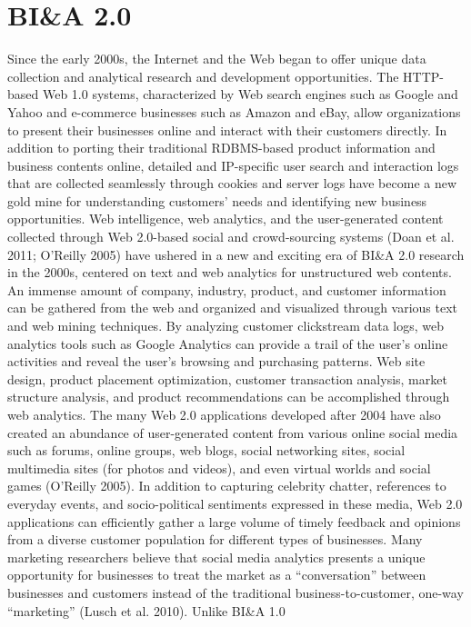 \section*{BI\&A 2.0}
Since the early 2000s, the Internet and the Web began to offer
unique data collection and analytical research and development opportunities. The HTTP-based Web 1.0 systems,
characterized by Web search engines such as Google and
Yahoo and e-commerce businesses such as Amazon and
eBay, allow organizations to present their businesses online
and interact with their customers directly. In addition to
porting their traditional RDBMS-based product information
and business contents online, detailed and IP-specific user
search and interaction logs that are collected seamlessly
through cookies and server logs have become a new gold
mine for understanding customers’ needs and identifying new
business opportunities. Web intelligence, web analytics, and
the user-generated content collected through Web 2.0-based
social and crowd-sourcing systems (Doan et al. 2011;
O’Reilly 2005) have ushered in a new and exciting era of
BI\&A 2.0 research in the 2000s, centered on text and web
analytics for unstructured web contents.
An immense amount of company, industry, product, and
customer information can be gathered from the web and
organized and visualized through various text and web mining
techniques. By analyzing customer clickstream data logs,
web analytics tools such as Google Analytics can provide a
trail of the user’s online activities and reveal the user’s
browsing and purchasing patterns. Web site design, product
placement optimization, customer transaction analysis, market
structure analysis, and product recommendations can be
accomplished through web analytics. The many Web 2.0
applications developed after 2004 have also created an abundance of user-generated content from various online social
media such as forums, online groups, web blogs, social networking sites, social multimedia sites (for photos and videos),
and even virtual worlds and social games (O’Reilly 2005). In
addition to capturing celebrity chatter, references to everyday
events, and socio-political sentiments expressed in these
media, Web 2.0 applications can efficiently gather a large
volume of timely feedback and opinions from a diverse
customer population for different types of businesses.
Many marketing researchers believe that social media
analytics presents a unique opportunity for businesses to treat
the market as a “conversation” between businesses and
customers instead of the traditional business-to-customer,
one-way “marketing” (Lusch et al. 2010). Unlike BI\&A 1.0
